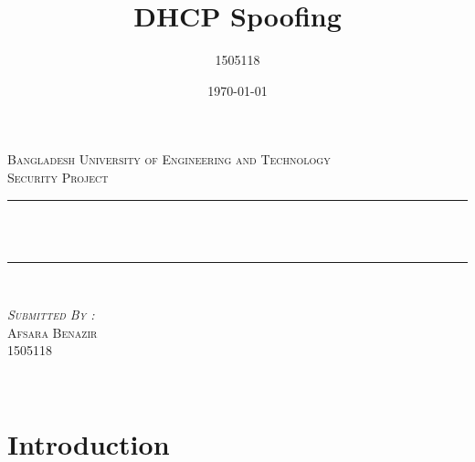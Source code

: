 \documentclass[12pt]{article}
\title{DHCP Spoofing}
\author{1505118}
\date{\today}
\makeatletter
\let\thetitle\@title
\makeatother
\begin{document}

\begin{titlepage}
	\centering
    \vspace*{0.5 cm}
    
    \textsc{\LARGE Bangladesh University of Engineering \newline\newline and Technology}\\[2.0 cm]	%
	\textsc{\Large Security Project}\\[0.5 cm]				%
	\rule{\linewidth}{0.2 mm} \\[0.4 cm]
	{ \huge \bfseries \thetitle}\\
	\rule{\linewidth}{0.2 mm} \\[1.5 cm]
	
		\begin{minipage}{0.4\textwidth}
		\begin{center} 
		\textsc{\Large \emph{Submitted By :} \\
					Afsara Benazir\\
					1505118}\\[0.5 cm]	
		\end{center}
		\end{minipage}~
		
		    
		
	

\end{titlepage}


\tableofcontents

\section{Introduction}
\end{document}
